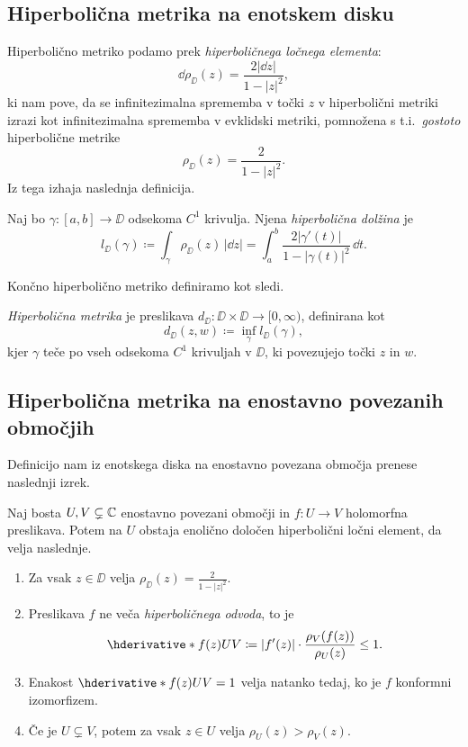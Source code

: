 \subsection{Hiperbolična metrika na enotskem disku}

Hiperbolično metriko podamo prek \emph{hiperboličnega ločnega elementa}:
\[\dd \rho_{\DD} (z) = \frac{2 |\dd z|}{1 - |z|^2},\]
ki nam pove, da se infinitezimalna sprememba v točki \(z\) v hiperbolični metriki izrazi kot infinitezimalna sprememba v evklidski metriki, pomnožena s t.i.~\emph{gostoto} hiperbolične metrike
\[\rho_{\DD} (z) = \frac{2}{1 - |z|^2}.\]
Iz tega izhaja naslednja definicija.

\begin{definicija}
    Naj bo \(\gamma \colon [a, b] \to \DD\) odsekoma \(C^1\) krivulja. Njena \emph{hiperbolična dolžina} je
    \[l_{\DD} (\gamma) \coloneq \int_{\gamma} \rho_{\DD} (z) \, | \dd z | = \int_{a}^{b} \frac{2 | \gamma' (t) | }{1 - | \gamma (t) |^2} \, \dd t.\]
\end{definicija}

\noindent Končno hiperbolično metriko definiramo kot sledi.

\begin{definicija}
    \emph{Hiperbolična metrika} je preslikava \(d_{\DD} \colon \DD \times \DD \to [0, \infty)\), definirana kot
    \[d_{\DD} (z, w) \coloneq \inf_{\gamma} l_{\DD} (\gamma),\]
    kjer \(\gamma\) teče po vseh odsekoma \(C^1\) krivuljah v \(\DD\), ki povezujejo točki \(z\) in \(w\).
\end{definicija}

\subsection{Hiperbolična metrika na enostavno povezanih območjih}

Definicijo nam iz enotskega diska na enostavno povezana območja prenese naslednji izrek.

\begin{izrek}[Pick] \label{thm:pick}
    Naj bosta \(U, V \subsetneq \mathbb C\) enostavno povezani območji in \(f \colon U \to V\) holomorfna preslikava. Potem na \(U\) obstaja enolično določen hiperbolični ločni element, da velja naslednje.
    \begin{enumerate}
        \item Za vsak \(z \in \DD\) velja \(\rho_{\DD} (z) = \frac{2}{1 - |z|^2}\).
        \item Preslikava \(f\) ne veča \emph{hiperboličnega odvoda}, to je \[\hder{f (z)}{U}{V} \coloneq |f' (z)| \cdot \frac{\rho_V (f (z))}{\rho_U (z)} \leq 1.\]
        \item Enakost \(\hder{f (z)}{U}{V} = 1\) velja natanko tedaj, ko je \(f\) konformni izomorfizem.
        \item Če je \(U \subsetneq V\), potem za vsak \(z \in U\) velja \(\rho_U (z) > \rho_V (z)\). 
    \end{enumerate}
\end{izrek}


